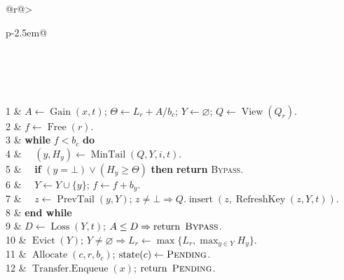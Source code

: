 \begin{algorithm}[t]
\caption{\textsc{SlackLandlord}}
\label{alg:slack-landlord}
\begin{tabular}{@{}r@{\hspace{0.5em}}>{\raggedright\arraybackslash}p{\dimexpr\columnwidth-2.5em\relax}@{}}
\\
\\
\\
\\
1 & $A\gets\operatorname{Gain}(x,t)$; $\Theta\gets L_r+A/b_c$; $Y\gets\varnothing$; $Q\gets\operatorname{View}(Q_r)$.\\
2 & $f\gets\operatorname{Free}(r)$.\\
3 & \textbf{while} $f<b_c$ \textbf{do}\\
4 & $\quad(y,H_y)\gets\operatorname{MinTail}(Q,Y,i,t)$.\\
5 & $\quad$\textbf{if} $(y=\bot)\lor(H_y\ge\Theta)$ \textbf{then} \textbf{return} \textsc{Bypass}.\\
6 & $\quad Y\gets Y\cup\{y\}$; $f\gets f+b_y$.\\
7 & $\quad z\gets\operatorname{PrevTail}(y,Y)$; $z\ne\bot\Rightarrow Q.\operatorname{insert}(z,\operatorname{RefreshKey}(z,Y,t))$.\\
8 & \textbf{end while}\\
9 & $D\gets\operatorname{Loss}(Y,t)$; $A\le D\Rightarrow\operatorname{return}\ \textsc{Bypass}$.\\
10 & $\operatorname{Evict}(Y)$; $Y\ne\varnothing\Rightarrow L_r\gets\max\{L_r,\max_{y\in Y}H_y\}$.\\
11 & $\operatorname{Allocate}(c,r,b_c)$; $\operatorname{state}(c)\gets\textsc{Pending}$.\\
12 & $\operatorname{Transfer.Enqueue}(x)$; $\operatorname{return}\ \textsc{Pending}$.\\

\end{tabular}
\end{algorithm}
